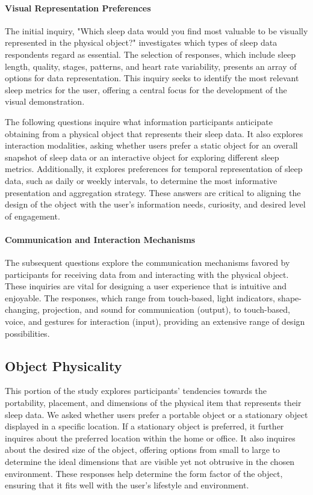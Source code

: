\documentclass[
  a4paper,  %
  twoside,  %
  bibliography=totoc,
  headsepline,
  cleardoublepage=empty,
  parskip=half,
  draft=false
]{scrbook}
\begin{document}
\paragraph{Visual Representation Preferences}
The initial inquiry, "Which sleep data would you find most valuable to be visually represented in the physical object?" investigates which types of sleep data respondents regard as essential. The selection of responses, which include sleep length, quality, stages, patterns, and heart rate variability, presents an array of options for data representation. This inquiry seeks to identify the most relevant sleep metrics for the user, offering a central focus for the development of the visual demonstration.

The following questions inquire what information participants anticipate obtaining from a physical object that represents their sleep data. It also explores interaction modalities, asking whether users prefer a static object for an overall snapshot of sleep data or an interactive object for exploring different sleep metrics. Additionally, it explores preferences for temporal representation of sleep data, such as daily or weekly intervals, to determine the most informative presentation and aggregation strategy. These answers are critical to aligning the design of the object with the user's information needs, curiosity, and desired level of engagement.
\paragraph{Communication and Interaction Mechanisms}
The subsequent questions explore the communication mechanisms favored by participants for receiving data from and interacting with the physical object. These inquiries are vital for designing a user experience that is intuitive and enjoyable. The responses, which range from touch-based, light indicators, shape-changing, projection, and sound for communication (output), to touch-based, voice, and gestures for interaction (input), providing an extensive range of design possibilities.
\subsection{Object Physicality}
This portion of the study explores participants' tendencies towards the portability, placement, and dimensions of the physical item that represents their sleep data. We asked whether users prefer a portable object or a stationary object displayed in a specific location. If a stationary object is preferred, it further inquires about the preferred location within the home or office. It also inquires about the desired size of the object, offering options from small to large to determine the ideal dimensions that are visible yet not obtrusive in the chosen environment. These responses help determine the form factor of the object, ensuring that it fits well with the user's lifestyle and environment.
\end{document}
